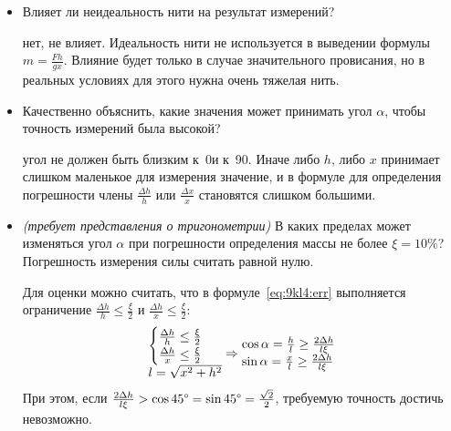 \AdditionalQuestions
\begin{itemize}
    \item Влияет ли неидеальность нити на результат измерений?\par
    \Answer нет, не влияет. Идеальность нити не используется в выведении формулы \(m=\frac{F h}{g x}\). Влияние будет только в случае значительного провисания, но в реальных условиях для этого нужна очень тяжелая нить.
    \item Качественно объяснить, какие значения может принимать угол \(\alpha\), чтобы точность измерений была высокой?\par
    \Answer угол не должен быть близким к~0\textdegree и к~90\textdegree. Иначе либо \(h\), либо \(x\) принимает слишком маленькое для измерения значение, и в формуле для определения погрешности члены \(\frac{\Delta h}{h}\) или \(\frac{\Delta x}{x}\) становятся слишком большими.
   \item \textit{(требует представления о тригонометрии)} В каких пределах может изменяться угол \(\alpha\) при погрешности определения массы не более \(\xi=10\% \)? Погрешность измерения силы считать равной нулю.\par
   \Answer Для оценки можно считать, что в формуле~\eqref{eq:9kl4:err} выполняется ограничение \(\frac{\Delta h}{h} \leq \frac{\xi}{2}\) и \(\frac{\Delta h}{x} \leq \frac{\xi}{2}\):
   \begin{equation*}
    \begin{array}{@{}l@{}}
        \begin{cases}
            \frac{\Delta h}{h} \leq \frac{\xi}{2} \\
            \frac{\Delta h}{x} \leq \frac{\xi}{2}
        \end{cases}\\
        l=\sqrt{x^2+h^2}
    \end{array}
    \Rightarrow
    \begin{array}{@{}l@{}} 
    	\cos \alpha = \frac{h}{l} \geq \frac{2\Delta h}{l\xi} \\
    	\sin \alpha = \frac{x}{l} \geq \frac{2\Delta h}{l\xi}
    \end{array}
    \end{equation*}
    При этом, если \(\frac{2\Delta h}{l\xi}>\cos45\text{\textdegree}=\sin45\text{\textdegree}=\frac{\sqrt{2}}{2}\), требуемую точность достичь невозможно.
\end{itemize}
